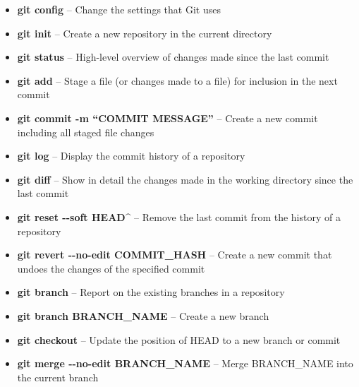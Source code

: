 \documentclass[9pt]{extarticle}
\def\itempad{-1pt}
\begin{document}
\begin{navybox}[title=Git Command Cheat Sheet]
  \begin{itemize}
    \itemsep\itempad
  \item \textbf{git config} -- Change the settings that Git uses
  \item \textbf{git init} -- Create a new repository in the current directory
  \item \textbf{git status} -- High-level overview of changes made since the last
    commit
  \item \textbf{git add} -- Stage a file (or changes made to a file) for
    inclusion in the next commit
  \item \textbf{git commit -m ``COMMIT MESSAGE''} -- Create a new commit
    including all staged file changes
  \item \textbf{git log} -- Display the commit history of a repository
  \item \textbf{git diff} -- Show in detail the changes made in the working
    directory since the last commit
  \item \textbf{git reset -{}-soft HEAD\^} -- Remove the last commit from the
    history of a repository
  \item \textbf{git revert -{}-no-edit COMMIT\_HASH} -- Create a new commit that
    undoes the changes of the specified commit
  \item \textbf{git branch} -- Report on the existing branches in a repository
  \item \textbf{git branch BRANCH\_NAME} -- Create a new branch
  \item \textbf{git checkout} -- Update the position of HEAD to a new branch or
    commit
  \item \textbf{git merge -{}-no-edit BRANCH\_NAME} -- Merge BRANCH\_NAME into the
    current branch
  \end{itemize}
\end{navybox}


\furtherhelp
\end{document}
